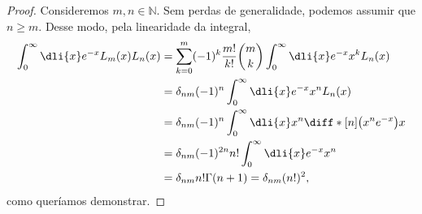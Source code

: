 \begin{proof}
    Consideremos \(m, n \in \mathbb{N}\). Sem perdas de generalidade, podemos assumir que \(n \geq m\). Desse modo, pela linearidade da integral,
    \begin{align*}
        \int_{0}^\infty \dli{x} e^{-x} L_m(x)L_n(x) &= \sum_{k = 0}^{m} (-1)^k \frac{m!}{k!}\binom{m}{k}\int_0^\infty \dli{x} e^{-x} x^k L_n(x)\\
                                                    &= \delta_{nm} (-1)^n \int_{0}^\infty \dli{x} e^{-x} x^n L_n(x)\\
                                                    &= \delta_{nm} (-1)^n \int_0^\infty \dli{x} x^n \diff*[n]{\left(x^n e^{-x}\right)}{x}\\
                                                    &= \delta_{nm} (-1)^{2n} n! \int_0^\infty \dli{x} e^{-x} x^n\\
                                                    &= \delta_{nm} n! \Gamma(n+1) = \delta_{nm} (n!)^2,
    \end{align*}
    como queríamos demonstrar.
\end{proof}

